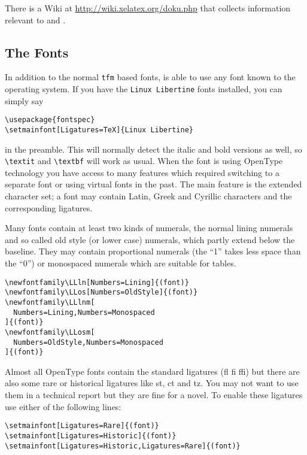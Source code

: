 There is a Wiki at \url{http://wiki.xelatex.org/doku.php} that collects
information relevant to  and .

\subsection{The Fonts}\label{sec:fontspec}

In addition to the normal \texttt{tfm} based fonts,  is able
to use any font known to the operating system. If you have the \texttt{Linux
Libertine} fonts installed, you can simply say

\begin{code}
\begin{verbatim}
\usepackage{fontspec}
\setmainfont[Ligatures=TeX]{Linux Libertine}
\end{verbatim}
\end{code}
%
in the preamble. This will normally detect the italic and bold versions as
well, so \verb|\textit| and \verb|\textbf| will work as usual. When the
font is using OpenType technology you have access to many features which
required switching to a separate font or using virtual fonts in the past.
The main feature is the extended character set; a font may contain Latin,
Greek and Cyrillic characters and the corresponding ligatures.

Many fonts contain at least two kinds of numerals, the normal lining
numerals and so called old style (or lower case) numerals, which partly
extend below the baseline. They may contain proportional numerals (the ``1''
takes less space than the ``0'') or monospaced numerals which are suitable
for tables.

\begin{code}
\begin{verbatim}
\newfontfamily\LLln[Numbers=Lining]{(font)}
\newfontfamily\LLos[Numbers=OldStyle]{(font)}
\newfontfamily\LLlnm[
  Numbers=Lining,Numbers=Monospaced
]{(font)}
\newfontfamily\LLosm[
  Numbers=OldStyle,Numbers=Monospaced
]{(font)}
\end{verbatim}
\end{code}

Almost all OpenType fonts contain the standard ligatures (fl fi ffi) but
there are also some rare or historical ligatures like st, ct and tz. You may
not want to use them in a technical report but they are fine for a novel. To
enable these ligatures use either of the following lines:

\begin{code}
\begin{verbatim}
\setmainfont[Ligatures=Rare]{(font)}
\setmainfont[Ligatures=Historic]{(font)}
\setmainfont[Ligatures=Historic,Ligatures=Rare]{(font)}
\end{verbatim}
\end{code}

